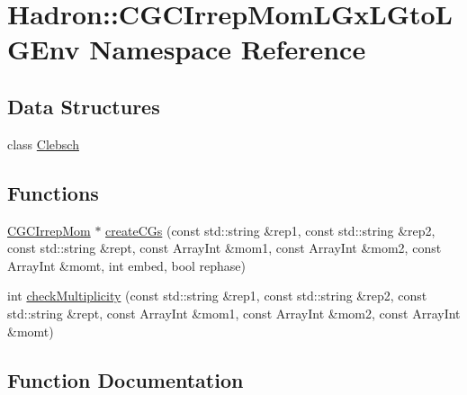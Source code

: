 \hypertarget{namespaceHadron_1_1CGC_1_1CGCIrrepMomLGxLGtoLGEnv}{}\section{Hadron\+:\+:C\+G\+C\+Irrep\+Mom\+L\+Gx\+L\+Gto\+L\+G\+Env Namespace Reference}
\label{namespaceHadron_1_1CGC_1_1CGCIrrepMomLGxLGtoLGEnv}
\subsection*{Data Structures}
\begin{DoxyCompactItemize}
\item 
class \mbox{\hyperlink{classHadron_1_1CGC_1_1CGCIrrepMomLGxLGtoLGEnv_1_1Clebsch}{Clebsch}}
\end{DoxyCompactItemize}
\subsection*{Functions}
\begin{DoxyCompactItemize}
\item 
\mbox{\hyperlink{classHadron_1_1CGCIrrepMom}{C\+G\+C\+Irrep\+Mom}} $\ast$ \mbox{\hyperlink{namespaceHadron_1_1CGC_1_1CGCIrrepMomLGxLGtoLGEnv_aac28a74a71012455c31bc9ba558b35da}{create\+C\+Gs}} (const std\+::string \&rep1, const std\+::string \&rep2, const std\+::string \&rept, const Array\+Int \&mom1, const Array\+Int \&mom2, const Array\+Int \&momt, int embed, bool rephase)
\item 
int \mbox{\hyperlink{namespaceHadron_1_1CGC_1_1CGCIrrepMomLGxLGtoLGEnv_ac903fc6025ce80a33975cbd2b635e7df}{check\+Multiplicity}} (const std\+::string \&rep1, const std\+::string \&rep2, const std\+::string \&rept, const Array\+Int \&mom1, const Array\+Int \&mom2, const Array\+Int \&momt)
\end{DoxyCompactItemize}


\subsection{Function Documentation}
\mbox{\label{namespaceHadron_1_1CGC_1_1CGCIrrepMomLGxLGtoLGEnv_ac903fc6025ce80a33975cbd2b635e7df}} 
